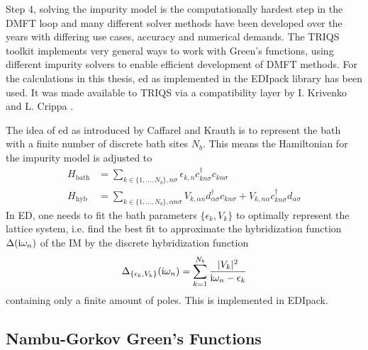 \documentclass[../notes.tex]{subfiles}
\begin{document}
Step 4, solving the impurity model is the computationally hardest step in the DMFT loop and many different solver methods have been developed over the years with differing use cases, accuracy and numerical demands.
The TRIQS toolkit \cite{parcolletTRIQSToolboxResearch2015} implements very general ways to work with Green's functions, using different impurity solvers to enable efficient development of DMFT methods.
For the calculations in this thesis, \acrfull{ed} as implemented in the EDIpack library \cite{amaricciEDIpackParallelExact2022} has been used.
It was made available to TRIQS via a compatibility layer by I. Krivenko and L. Crippa \cite{krivenkoKrivenkoEdipack2triqs2025}.

The idea of \acrshort{ed} as introduced by Caffarel and Krauth \cite{caffarelExactDiagonalizationApproach1994} is to represent the bath with a finite number of discrete bath sites \(N_b\).
This means the Hamiltonian for the impurity model is adjusted to
\begin{align}
	H_{\mathrm{bath}} &= \sum_{k \in \{1, \ldots, N_b\}, n \sigma} \epsilon_{k, n} c_{k n \sigma}^{\dagger} c_{k n \sigma}  \\
	H_{\mathrm{hyb}} &= \sum_{k \in \{1, \ldots, N_b\}, \alpha n \sigma} V_{k, \alpha n} d_{\alpha \sigma}^{\dagger} c_{k n \sigma} + V_{k, n \alpha} c_{k n \sigma}^{\dagger} d_{\alpha \sigma}
\end{align}
In ED, one needs to fit the bath parameters \(\{\epsilon_k, V_k\}\) to optimally represent the lattice system, i.e. find the best fit to approximate the hybridization function \(\Delta (\mathrm{i} \omega_n)\) of the IM by the discrete hybridization function
\begin{equation}
	\Delta_{\{\epsilon_k, V_k\}} (\mathrm{i} \omega_n) = \sum_{k=1}^{N_b} \frac{\vert V_k \vert^2}{\mathrm{i} \omega_n - \epsilon_k}
\end{equation}
containing only a finite amount of poles.
This is implemented in EDIpack.

\subsection*{Nambu-Gorkov Green's Functions}
\end{document}

